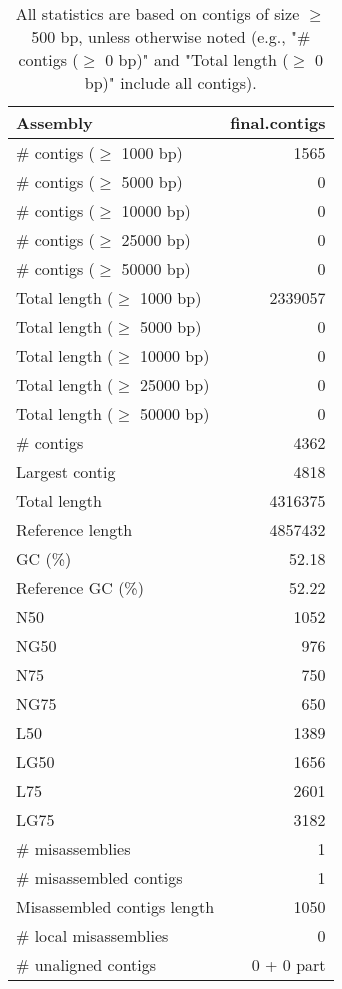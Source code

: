 \documentclass[12pt,a4paper]{article}
\begin{document}
\begin{table}[ht]
\begin{center}
\caption{All statistics are based on contigs of size $\geq$ 500 bp, unless otherwise noted (e.g., "\# contigs ($\geq$ 0 bp)" and "Total length ($\geq$ 0 bp)" include all contigs).}
\begin{tabular}{|l*{1}{|r}|}
\hline
Assembly & final.contigs \\ \hline
\# contigs ($\geq$ 1000 bp) & 1565 \\ \hline
\# contigs ($\geq$ 5000 bp) & 0 \\ \hline
\# contigs ($\geq$ 10000 bp) & 0 \\ \hline
\# contigs ($\geq$ 25000 bp) & 0 \\ \hline
\# contigs ($\geq$ 50000 bp) & 0 \\ \hline
Total length ($\geq$ 1000 bp) & 2339057 \\ \hline
Total length ($\geq$ 5000 bp) & 0 \\ \hline
Total length ($\geq$ 10000 bp) & 0 \\ \hline
Total length ($\geq$ 25000 bp) & 0 \\ \hline
Total length ($\geq$ 50000 bp) & 0 \\ \hline
\# contigs & 4362 \\ \hline
Largest contig & 4818 \\ \hline
Total length & 4316375 \\ \hline
Reference length & 4857432 \\ \hline
GC (\%) & 52.18 \\ \hline
Reference GC (\%) & 52.22 \\ \hline
N50 & 1052 \\ \hline
NG50 & 976 \\ \hline
N75 & 750 \\ \hline
NG75 & 650 \\ \hline
L50 & 1389 \\ \hline
LG50 & 1656 \\ \hline
L75 & 2601 \\ \hline
LG75 & 3182 \\ \hline
\# misassemblies & 1 \\ \hline
\# misassembled contigs & 1 \\ \hline
Misassembled contigs length & 1050 \\ \hline
\# local misassemblies & 0 \\ \hline
\# unaligned contigs & 0 + 0 part \\ \hline

\end{tabular}
\end{center}
\end{table}
\end{document}

